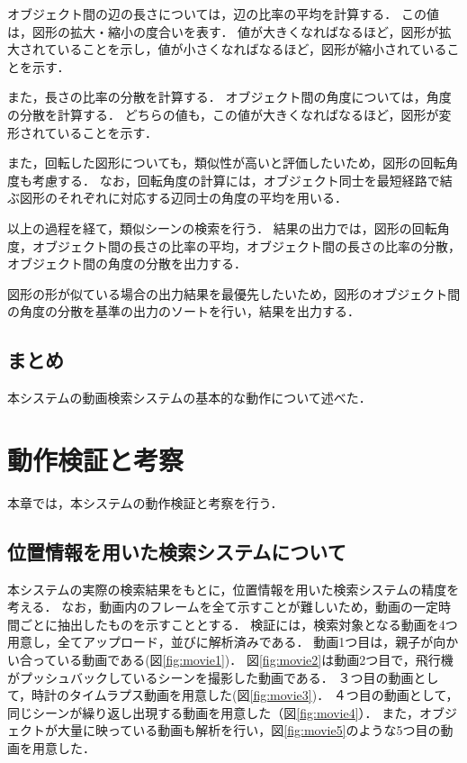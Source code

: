 \documentclass[a4j,12pt,dvipdfmx]{jreport}
\begin{document}
オブジェクト間の辺の長さについては，辺の比率の平均を計算する．
この値は，図形の拡大・縮小の度合いを表す．
値が大きくなればなるほど，図形が拡大されていることを示し，値が小さくなればなるほど，図形が縮小されていることを示す．

また，長さの比率の分散を計算する．
オブジェクト間の角度については，角度の分散を計算する．
どちらの値も，この値が大きくなればなるほど，図形が変形されていることを示す．

また，回転した図形についても，類似性が高いと評価したいため，図形の回転角度も考慮する．
なお，回転角度の計算には，オブジェクト同士を最短経路で結ぶ図形のそれぞれに対応する辺同士の角度の平均を用いる．

以上の過程を経て，類似シーンの検索を行う．
結果の出力では，図形の回転角度，オブジェクト間の長さの比率の平均，オブジェクト間の長さの比率の分散，オブジェクト間の角度の分散を出力する．

図形の形が似ている場合の出力結果を最優先したいため，図形のオブジェクト間の角度の分散を基準の出力のソートを行い，結果を出力する．

\section{まとめ}
本システムの動画検索システムの基本的な動作について述べた．

\clearpage

\chapter{動作検証と考察}
\label{sec:consideration}
本章では，本システムの動作検証と考察を行う．
\section{位置情報を用いた検索システムについて}
本システムの実際の検索結果をもとに，位置情報を用いた検索システムの精度を考える．
なお，動画内のフレームを全て示すことが難しいため，動画の一定時間ごとに抽出したものを示すこととする．
検証には，検索対象となる動画を4つ用意し，全てアップロード，並びに解析済みである．
動画1つ目は，親子が向かい合っている動画である(図\ref{fig:movie1})．
図\ref{fig:movie2}は動画2つ目で，飛行機がプッシュバックしているシーンを撮影した動画である．
３つ目の動画として，時計のタイムラプス動画を用意した(図\ref{fig:movie3})．
４つ目の動画として，同じシーンが繰り返し出現する動画を用意した（図\ref{fig:movie4}）．
また，オブジェクトが大量に映っている動画も解析を行い，図\ref{fig:movie5}のような5つ目の動画を用意した．
\end{document}
